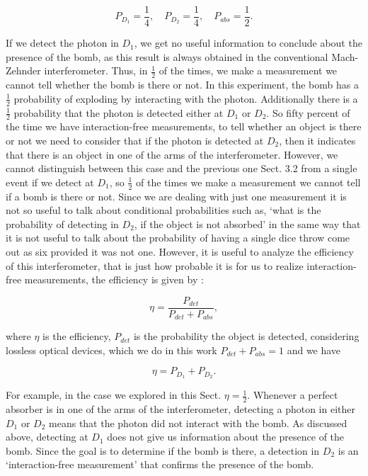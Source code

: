 \documentclass[12pt]{book}
\begin{document}
\begin{equation}
P_{D_{1}}=\frac{1}{4},\quad P_{D_{2}}=\frac{1}{4}, \quad P_{abs}=\frac{1}{2}.
\end{equation}



If we detect the photon in $D_{1}$, we get no useful information to conclude about the presence of the bomb, as this result is always obtained in the conventional Mach-Zehnder interferometer. Thus, in $\frac{1}{2}$ of the times, we make a measurement we cannot tell whether the bomb is there or not. In this experiment, the bomb has a $\frac{1}{2}$ probability of exploding by interacting with the photon. Additionally there is a $\frac{1}{2}$ probability that the photon is detected either at $D_{1}$ or $D_{2}$. So fifty percent of the time we have interaction-free measurements, to tell whether an object is there or not we need to consider that if the photon is detected at $D_{2}$, then it indicates that there is an object in one of the arms of the interferometer. However, we cannot distinguish between this case and the previous one Sect. 3.2 from a single event if we detect at $D_{1}$, so $\frac{1}{2}$ of the times we make a measurement we cannot tell if a bomb is there or not. Since we are dealing with just one measurement it is not so useful to talk about conditional probabilities such as, `what is the probability of detecting in $D_{2}$, if the object is not absorbed' in the same way that it is not useful to talk about the probability of having a single dice throw come out as six provided it was not one. However, it is useful to analyze the efficiency of this interferometer, that is just how probable it is for us to realize interaction-free measurements, the efficiency is given by \cite{5}:

\begin{equation}
\eta=\frac{P_{det}}{P_{det}+P_{abs}},
\end{equation}

where $\eta$ is the efficiency, $P_{det}$ is the probability the object is detected, considering lossless optical devices, which we do in this work $P_{det}+P_{abs}=1$ and we have

\begin{equation}
\eta=P_{D_{1}}+P_{D_{2}}.
\end{equation}

For example, in the case we explored in this Sect. $\eta=\frac{1}{2}$.  Whenever a perfect absorber is in one of the arms of the interferometer, detecting a photon in either $D_1$ or $D_2$ means that the photon did not interact with the bomb. As discussed above, detecting at $D_1$ does not give us information about the presence of the bomb. Since the goal is to determine if the bomb is there, a detection in $D_2$ is an ‘interaction-free measurement’ that confirms the presence of the bomb.
  
\end{document}
